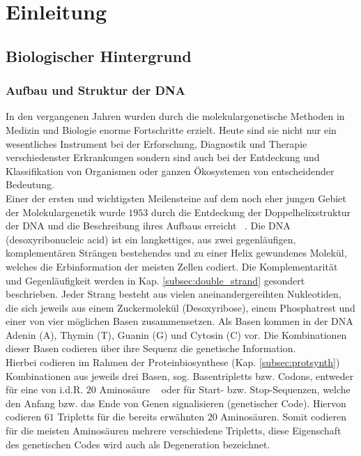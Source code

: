 \chapter{Einleitung} \label{sec:introduction}
\section{Biologischer Hintergrund} \label{sec:biology}
\subsection{Aufbau und Struktur der DNA} \label{subsec:dna}


In den vergangenen Jahren wurden durch die molekulargenetische Methoden in Medizin und Biologie enorme Fortschritte erzielt. Heute sind sie nicht nur ein wesentliches Instrument bei der Erforschung, Diagnostik und Therapie verschiedenster Erkrankungen sondern sind auch bei der Entdeckung und Klassifikation von Organismen oder ganzen Ökosystemen von entscheidender Bedeutung.  \\


Einer der ersten und wichtigsten Meilensteine auf dem noch eher jungen Gebiet der Molekulargenetik wurde $1953$ durch die Entdeckung der Doppelhelixstruktur der DNA und die Beschreibung ihres Aufbaus erreicht ~\cite{watson_1953}. Die DNA (desoxyribonucleic acid) ist ein langkettiges, aus zwei gegenläufigen, komplementären Strängen bestehendes und zu einer Helix gewundenes Molekül, welches die Erbinformation der meisten Zellen codiert. Die Komplementarität und Gegenläufigkeit werden in Kap. \ref{subsec:double_strand} gesondert beschrieben. Jeder Strang besteht aus vielen aneinandergereihten Nukleotiden, die sich jeweils aus einem Zuckermolekül (Desoxyribose), einem Phosphatrest und einer von vier möglichen Basen zusammensetzen. Als Basen kommen in der DNA Adenin (A), Thymin (T), Guanin (G) und Cytosin (C) vor. Die Kombinationen dieser Basen codieren über ihre Sequenz die genetische Information.  \\

Hierbei codieren im Rahmen der Proteinbiosynthese (Kap. \ref{subsec:protsynth}) Kombinationen aus jeweils drei Basen, sog. Basentripletts bzw. Codons, entweder für eine von i.d.R. $ 20 $ Aminosäure ~\cite{martin_1961, matthaei_1961} oder für Start- bzw. Stop-Sequenzen, welche den Anfang bzw. das Ende von Genen signalisieren (genetischer Code). Hiervon codieren $ 61 $ Tripletts für die bereits erwähnten $ 20 $ Aminosäuren. Somit codieren für die meisten Aminosäuren mehrere verschiedene Tripletts, diese Eigenschaft des genetischen Codes wird auch als Degeneration bezeichnet. \\

